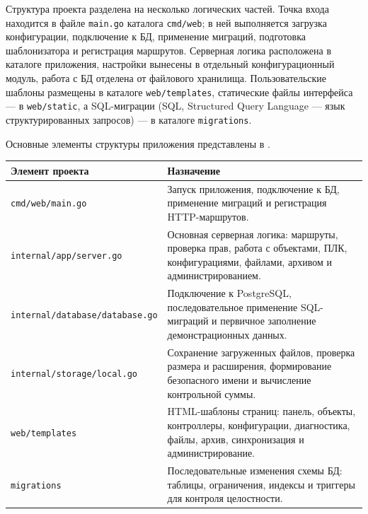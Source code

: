 Структура проекта разделена на несколько логических частей. Точка входа находится в файле \texttt{main.go} каталога \texttt{cmd/web}; в ней выполняется загрузка конфигурации, подключение к БД, применение миграций, подготовка шаблонизатора и регистрация маршрутов. Серверная логика расположена в каталоге приложения, настройки вынесены в отдельный конфигурационный модуль, работа с БД отделена от файлового хранилища. Пользовательские шаблоны размещены в каталоге \texttt{web/templates}, статические файлы интерфейса --- в \texttt{web/static}, а SQL-миграции (SQL, Structured Query Language --- язык структурированных запросов) --- в каталоге \texttt{migrations}.

Основные элементы структуры приложения представлены в .

\begin{center}
    \small
    \label{tab:chapter3_structure}
    \begin{tabularx}{\textwidth}{|>{\raggedright\arraybackslash}p{}|>{\raggedright\arraybackslash}X|}
        \hline
        \textbf{Элемент проекта} & \textbf{Назначение} \\ \hline
        \texttt{cmd/web/}\newline\texttt{main.go} & Запуск приложения, подключение к БД, применение миграций и регистрация HTTP-маршрутов. \\ \hline
        \texttt{internal/app/}\newline\texttt{server.go} & Основная серверная логика: маршруты, проверка прав, работа с объектами, ПЛК, конфигурациями, файлами, архивом и администрированием. \\ \hline
        \texttt{internal/database/}\newline\texttt{database.go} & Подключение к PostgreSQL, последовательное применение SQL-миграций и первичное заполнение демонстрационных данных. \\ \hline
        \texttt{internal/storage/}\newline\texttt{local.go} & Сохранение загруженных файлов, проверка размера и расширения, формирование безопасного имени и вычисление контрольной суммы. \\ \hline
        \texttt{web/templates} & HTML-шаблоны страниц: панель, объекты, контроллеры, конфигурации, диагностика, файлы, архив, синхронизация и администрирование. \\ \hline
        \texttt{migrations} & Последовательные изменения схемы БД: таблицы, ограничения, индексы и триггеры для контроля целостности. \\ \hline
    \end{tabularx}
    \normalsize
\end{center}

